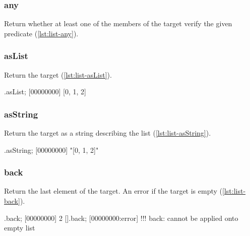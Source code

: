 \subsubsection{any}

Return whether at least one of the members of the target verify the
given predicate (\autoref{lst:list-any}).


\subsubsection{asList}

Return the target (\autoref{lst:list-asList}).

\begin{urbiscript}[caption=List.asList, label=lst:list-asList, float=\floatposh]
[0, 1, 2].asList;
[00000000] [0, 1, 2]
\end{urbiscript}

\subsubsection{asString}

Return the target as a string describing the list
(\autoref{lst:list-asString}).

\begin{urbiscript}[caption=List.asString, label=lst:list-asString, float=\floatposh]
[0, 1, 2].asString;
[00000000] "[0, 1, 2]"
\end{urbiscript}

\subsubsection{back}

Return the last element of the target. An error if the target is empty
(\autoref{lst:list-back}).

\begin{urbiscript}[caption=List.back, label=lst:list-back, float=\floatposh]
[0, 1, 2].back;
[00000000] 2
[].back;
[00000000:error] !!! back: cannot be applied onto empty list
\end{urbiscript}

